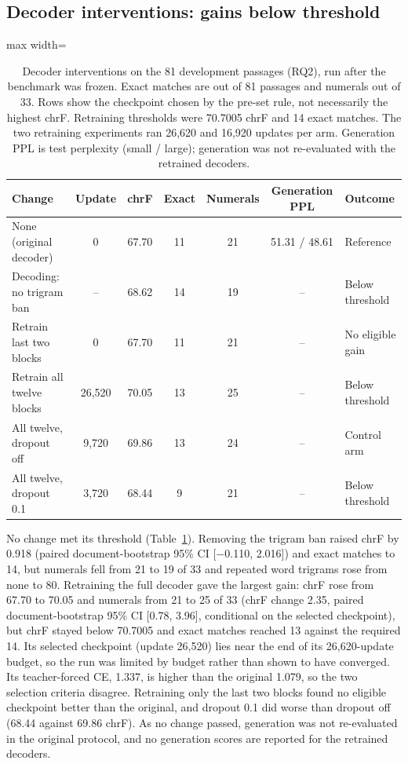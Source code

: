 \documentclass[11pt,a4paper]{article}
\begin{document}
\subsection{Decoder interventions: gains below threshold}
\label{sec:res-interventions}

\begin{table}[t]
\centering
\small
\setlength{\tabcolsep}{4pt}
\begin{adjustbox}{max width=\textwidth}
\begin{tabular}{lcccccl}
\toprule
Change & Update & chrF & Exact & Numerals & Generation PPL & Outcome \\
\midrule
None (original decoder) & 0 & 67.70 & 11 & 21 & 51.31 / 48.61 & Reference \\
Decoding: no trigram ban & -- & 68.62 & 14 & 19 & -- & Below threshold \\
Retrain last two blocks & 0 & 67.70 & 11 & 21 & -- & No eligible gain \\
Retrain all twelve blocks & 26,520 & 70.05 & 13 & 25 & -- & Below threshold \\
All twelve, dropout off & 9,720 & 69.86 & 13 & 24 & -- & Control arm \\
All twelve, dropout 0.1 & 3,720 & 68.44 & 9 & 21 & -- & Below threshold \\
\bottomrule
\end{tabular}
\end{adjustbox}
\caption{Decoder interventions on the 81 development passages (RQ2), run after the benchmark was frozen. Exact matches are out of 81 passages and numerals out of 33. Rows show the checkpoint chosen by the pre-set rule, not necessarily the highest chrF. Retraining thresholds were 70.7005 chrF and 14 exact matches. The two retraining experiments ran 26,620 and 16,920 updates per arm. Generation PPL is test perplexity (small / large); generation was not re-evaluated with the retrained decoders.}
\label{tab:interventions}
\end{table}

No change met its threshold (Table~\ref{tab:interventions}). Removing the trigram ban raised chrF by 0.918 (paired document-bootstrap 95\% CI [$-$0.110, 2.016]) and exact matches to 14, but numerals fell from 21 to 19 of 33 and repeated word trigrams rose from none to 80. Retraining the full decoder gave the largest gain: chrF rose from 67.70 to 70.05 and numerals from 21 to 25 of 33 (chrF change 2.35, paired document-bootstrap 95\% CI [0.78, 3.96], conditional on the selected checkpoint), but chrF stayed below 70.7005 and exact matches reached 13 against the required 14. Its selected checkpoint (update 26,520) lies near the end of its 26,620-update budget, so the run was limited by budget rather than shown to have converged. Its teacher-forced CE, 1.337, is higher than the original 1.079, so the two selection criteria disagree. Retraining only the last two blocks found no eligible checkpoint better than the original, and dropout 0.1 did worse than dropout off (68.44 against 69.86 chrF). As no change passed, generation was not re-evaluated in the original protocol, and no generation scores are reported for the retrained decoders.
\end{document}
